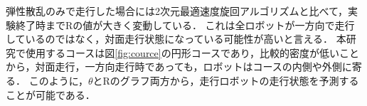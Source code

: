 \documentclass[twocolumn,dvipdfmx]{jarticle}
\begin{document}
弾性散乱のみで走行した場合には2次元最適速度旋回アルゴリズムと比べて，実験終了時までRの値が大きく変動している．
これは全ロボットが一方向で走行しているのではなく，対面走行状態になっている可能性が高いと言える．
本研究で使用するコースは図\ref{fig:cource}の円形コースであり，比較的密度が低いことから，対面走行，一方向走行時であっても，ロボットはコースの内側や外側に寄る．
このように，$\theta$とRのグラフ両方から，走行ロボットの走行状態を予測することが可能である．

\end{document}
